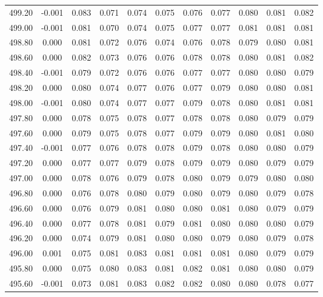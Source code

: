 \begin{longtable}{cccccccccc}
    499.20 & -0.001 &  0.083 &  0.071 &  0.074 &  0.075 &  0.076 &  0.077 &  0.080 &  0.081 &  0.082 \\
    499.00 & -0.001 &  0.081 &  0.070 &  0.074 &  0.075 &  0.077 &  0.077 &  0.081 &  0.081 &  0.081 \\
    498.80 &  0.000 &  0.081 &  0.072 &  0.076 &  0.074 &  0.076 &  0.078 &  0.079 &  0.080 &  0.081 \\
    498.60 &  0.000 &  0.082 &  0.073 &  0.076 &  0.076 &  0.078 &  0.078 &  0.080 &  0.081 &  0.082 \\
    498.40 & -0.001 &  0.079 &  0.072 &  0.076 &  0.076 &  0.077 &  0.077 &  0.080 &  0.080 &  0.079 \\
    498.20 &  0.000 &  0.080 &  0.074 &  0.077 &  0.076 &  0.077 &  0.079 &  0.080 &  0.080 &  0.081 \\
    498.00 & -0.001 &  0.080 &  0.074 &  0.077 &  0.077 &  0.079 &  0.078 &  0.080 &  0.081 &  0.081 \\
    497.80 &  0.000 &  0.078 &  0.075 &  0.078 &  0.077 &  0.078 &  0.078 &  0.080 &  0.079 &  0.079 \\
    497.60 &  0.000 &  0.079 &  0.075 &  0.078 &  0.077 &  0.079 &  0.079 &  0.080 &  0.081 &  0.080 \\
    497.40 & -0.001 &  0.077 &  0.076 &  0.078 &  0.078 &  0.079 &  0.078 &  0.080 &  0.080 &  0.079 \\
    497.20 &  0.000 &  0.077 &  0.077 &  0.079 &  0.078 &  0.079 &  0.079 &  0.080 &  0.079 &  0.079 \\
    497.00 &  0.000 &  0.078 &  0.076 &  0.079 &  0.078 &  0.080 &  0.079 &  0.079 &  0.080 &  0.080 \\
    496.80 &  0.000 &  0.076 &  0.078 &  0.080 &  0.079 &  0.080 &  0.079 &  0.080 &  0.079 &  0.078 \\
    496.60 &  0.000 &  0.076 &  0.079 &  0.081 &  0.080 &  0.080 &  0.081 &  0.080 &  0.079 &  0.079 \\
    496.40 &  0.000 &  0.077 &  0.078 &  0.081 &  0.079 &  0.081 &  0.080 &  0.080 &  0.080 &  0.079 \\
    496.20 &  0.000 &  0.074 &  0.079 &  0.081 &  0.080 &  0.080 &  0.079 &  0.080 &  0.079 &  0.078 \\
    496.00 &  0.001 &  0.075 &  0.081 &  0.083 &  0.081 &  0.081 &  0.081 &  0.080 &  0.079 &  0.079 \\
    495.80 &  0.000 &  0.075 &  0.080 &  0.083 &  0.081 &  0.082 &  0.081 &  0.080 &  0.080 &  0.079 \\
    495.60 & -0.001 &  0.073 &  0.081 &  0.083 &  0.082 &  0.082 &  0.080 &  0.080 &  0.078 &  0.077 \\

\end{longtable}
